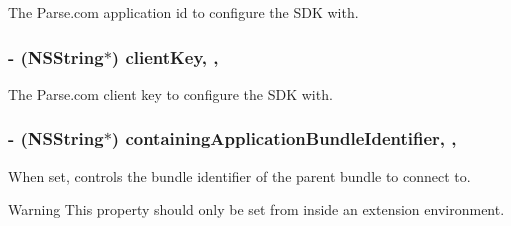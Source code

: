  





The Parse.\+com application id to configure the S\+D\+K with. \hypertarget{interface_parse_client_configuration_aa03409b9cd2f80d746864df84e2cc4b3}{}
\subsubsection[{client\+Key}]{\setlength{\rightskip}{0pt plus 5cm}-\/ (N\+S\+String$\ast$) client\+Key\hspace{0.3cm}{\ttfamily [read]}, {\ttfamily [nonatomic]}, {\ttfamily [copy]}}\label{interface_parse_client_configuration_aa03409b9cd2f80d746864df84e2cc4b3}
The Parse.\+com client key to configure the S\+D\+K with. \hypertarget{interface_parse_client_configuration_aeb495f4191b53673494490d582440e08}{}
\subsubsection[{containing\+Application\+Bundle\+Identifier}]{\setlength{\rightskip}{0pt plus 5cm}-\/ (N\+S\+String$\ast$) containing\+Application\+Bundle\+Identifier\hspace{0.3cm}{\ttfamily [read]}, {\ttfamily [nonatomic]}, {\ttfamily [copy]}}\label{interface_parse_client_configuration_aeb495f4191b53673494490d582440e08}
When set, controls the bundle identifier of the parent bundle to connect to.

\begin{DoxyWarning}{Warning}
This property should only be set from inside an extension environment. 
\end{DoxyWarning}
\hypertarget{interface_parse_client_configuration_a5cc5a601fbe36c5acc1b047bf8084b89}{}
